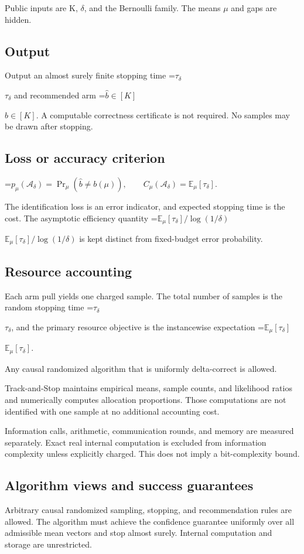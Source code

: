 \documentclass[10pt,a4paper]{article}
\newcommand{\AtlasMath}[1]{\par\begingroup\centering\setbox0=\hbox{$\displaystyle #1$}\ifdim\wd0>1.4\linewidth\typeout{ATLAS WIDE FORMULA: \the\wd0}\fi\ifdim\wd0>\linewidth\resizebox{\linewidth}{!}{\box0}\else\box0\fi\par\endgroup}
\newcommand{\AtlasInlineMath}[1]{\begingroup\setbox0=\hbox{$#1$}\ifdim\wd0>.4\linewidth\endgroup\AtlasMath{#1}\else\endgroup$#1$\fi}
\begin{document}
Public inputs are K, $\delta$, and the Bernoulli family. The means $\mu$ and gaps are hidden.

\subsection{Output}
Output an almost surely finite stopping time \AtlasInlineMath{\tau_\delta} and recommended arm \AtlasInlineMath{\widehat{b}\in[K]}. A computable correctness certificate is not required. No samples may be drawn after stopping.

\subsection{Loss or accuracy criterion}

\AtlasMath{p_\mu(\mathcal{A}_\delta)=\Pr_\mu(\widehat{b}\ne b(\mu)),\qquad C_\mu(\mathcal{A}_\delta)=\mathbb{E}_\mu[\tau_\delta].}


The identification loss is an error indicator, and expected stopping time is the cost. The asymptotic efficiency quantity \AtlasInlineMath{\mathbb{E}_\mu[\tau_\delta]/\log(1/\delta)} is kept distinct from fixed-budget error probability.

\subsection{Resource accounting}
Each arm pull yields one charged sample. The total number of samples is the random stopping time \AtlasInlineMath{\tau_\delta}, and the primary resource objective is the instancewise expectation \AtlasInlineMath{\mathbb{E}_\mu[\tau_\delta]}.

Any causal randomized algorithm that is uniformly delta-correct is allowed.

Track-and-Stop maintains empirical means, sample counts, and likelihood ratios and numerically computes allocation proportions. Those computations are not identified with one sample at no additional accounting cost.

Information calls, arithmetic, communication rounds, and memory are measured separately. Exact real internal computation is excluded from information complexity unless explicitly charged. This does not imply a bit-complexity bound.

\subsection{Algorithm views and success guarantees}
Arbitrary causal randomized sampling, stopping, and recommendation rules are allowed. The algorithm must achieve the confidence guarantee uniformly over all admissible mean vectors and stop almost surely. Internal computation and storage are unrestricted.
\end{document}
